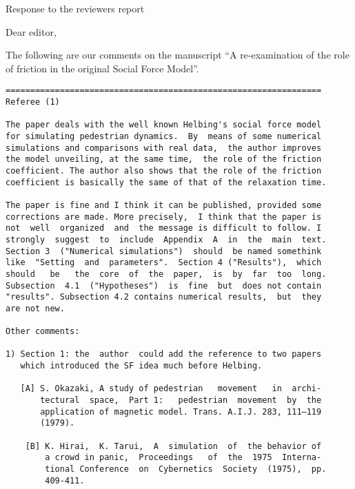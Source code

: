 \documentclass[a4paper,12pt]{letter}
\begin{document}

\begin{letter}{Response to the reviewers report}

\opening{}

Dear editor, 

The following are our comments on the manuscript ``A re-examination of the role 
of friction in the original Social Force Model''. 



\begin{verbatim}
================================================================
Referee (1)

The paper deals with the well known Helbing's social force model
for simulating pedestrian dynamics.  By  means of some numerical
simulations and comparisons with real data,  the author improves
the model unveiling, at the same time,  the role of the friction
coefficient. The author also shows that the role of the friction
coefficient is basically the same of that of the relaxation time.

The paper is fine and I think it can be published, provided some
corrections are made. More precisely,  I think that the paper is 
not  well  organized  and  the message is difficult to follow. I
strongly  suggest  to  include  Appendix  A  in  the  main  text. 
Section 3  ("Numerical simulations")  should  be named somethink 
like  "Setting  and  parameters".  Section 4 ("Results"),  which 
should   be   the  core  of  the  paper,  is  by  far  too  long. 
Subsection  4.1  ("Hypotheses")  is  fine  but  does not contain 
"results". Subsection 4.2 contains numerical results,  but  they
are not new.

Other comments:

1) Section 1: the  author  could add the reference to two papers
   which introduced the SF idea much before Helbing.

   [A] S. Okazaki, A study of pedestrian   movement   in  archi-
       tectural  space,  Part 1:   pedestrian  movement  by  the 
       application of magnetic model. Trans. A.I.J. 283, 111–119
       (1979).

    [B] K. Hirai,  K. Tarui,  A  simulation  of  the behavior of
        a crowd in panic,  Proceedings   of  the  1975  Interna-
        tional Conference  on  Cybernetics  Society  (1975),  pp.
        409-411.


\end{verbatim}
\end{letter}
\end{document}
